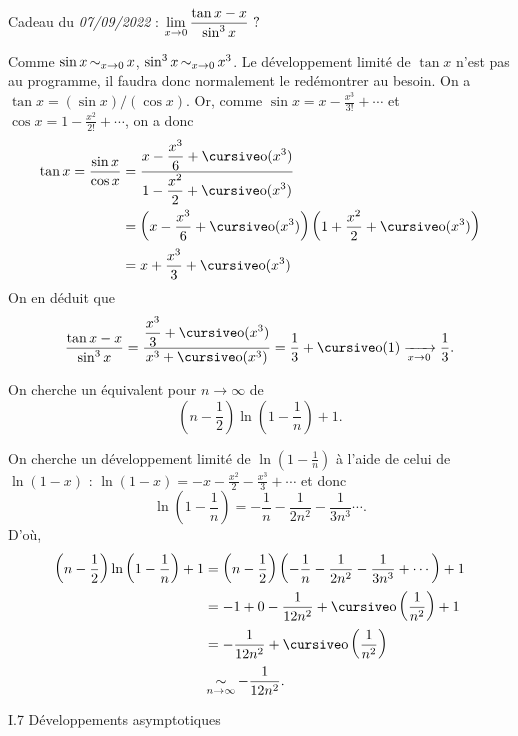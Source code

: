 \vspace{1cm}

Cadeau du {\it 07/09/2022}\/ : $\displaystyle \lim_{x\to 0} \frac{\tan x - x}{\sin^3 x}~?$

\vspace{2mm}

Comme $\sin x \operatorname*{\sim}_{x\to 0} x$, $\sin^3 x \operatorname*{\sim}_{x\to 0} x^3$.
Le développement limité de $\tan x$\/ n'est pas au programme, il faudra donc normalement le redémontrer au besoin. On a $\tan x = (\sin x) / (\cos x)$. Or, comme $\sin x = x - \frac{x^3}{3!} + \cdots$\/ et $\cos x = 1 - \frac{x^2}{2!} + \cdots$, on a donc
\begin{align*}
	\tan x = \frac{\sin x}{\cos x} &= \frac{\ds x - \frac{x^3}{6} + \po(x^3)}{\ds 1 - \frac{x^2}{2} + \po(x^3)} \\
	&= \left(x - \frac{x^3}{6} + \po(x^3)\right)\left(1 + \frac{x^2}{2} + \po(x^3)\right) \\
	&= x + \frac{x^3}{3} + \po(x^3) \\
\end{align*}
On en déduit que \[
	\frac{\tan x - x}{\sin^3 x} = \frac{\ds \frac{x^3}{3} + \po(x^3)}{x^3 + \po(x^3)} = \frac{1}{3} + \po(1) \tendsto{x\to 0} \frac{1}{3}
.\]

\bigskip

On cherche un équivalent pour $n\to \infty$\/ de \[
	\left( n - \frac{1}{2} \right) \ln\left( 1- \frac{1}{n} \right) + 1
.\]

On cherche un développement limité de $\ln\left( 1 - \frac{1}{n} \right)$\/ à l'aide de celui de $\ln(1-x)$\/ : $\ln(1-x) = -x - \frac{x^2}{2} - \frac{x^3}{3} + \cdots$\/ et donc \[
	\ln\left( 1 - \frac{1}{n} \right) = -\frac{1}{n} - \frac{1}{2n^2} - \frac{1}{3n^3} \cdots
.\] D'où,
\begin{align*}
	\left(n-\frac{1}{2}\right) \ln\left( 1 - \frac{1}{n} \right) + 1 &= \left( n - \frac{1}{2} \right)\left( -\frac{1}{n} - \frac{1}{2n^2} - \frac{1}{3n^3} + \cdots \right) + 1\\
	&= -1 + 0 - \frac{1}{12n^2} + \po\left( \frac{1}{n^2} \right) + 1 \\
	&= -\frac{1}{12n^2} + \po\left( \frac{1}{n^2} \right) \\
	&\simi_{n\to \infty} -\frac{1}{12n^2}.
\end{align*}

\bigskip

\begin{center}
	\large\sc I.7 \quad Développements asymptotiques
\end{center}

